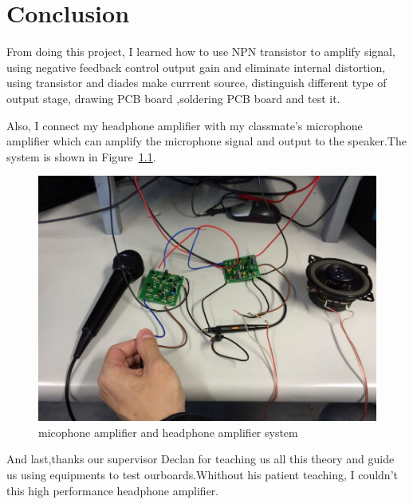 \chapter{Conclusion}
From doing this project, I learned how to use NPN transistor to amplify signal, using negative feedback control output gain and eliminate internal distortion, using transistor and diades make currrent source, distinguish different type of output stage, drawing PCB board ,soldering PCB board and test it.

Also, I connect my headphone amplifier with my classmate's microphone amplifier which can amplify the microphone signal and output to the speaker.The system is shown in Figure~\ref{fig:micophone amplifier and headphone amplifier system}.
\begin{figure}[htbp]
\centering
\includegraphics[scale=0.6]{"../Photo/Chap7/last system"}
\caption{micophone amplifier and headphone amplifier system}
\label{fig:micophone amplifier and headphone amplifier system}
\end{figure}

And last,thanks our supervisor Declan for teaching us all this theory and guide us using equipments to test ourboards.Whithout his patient teaching, I couldn't this high performance headphone amplifier.